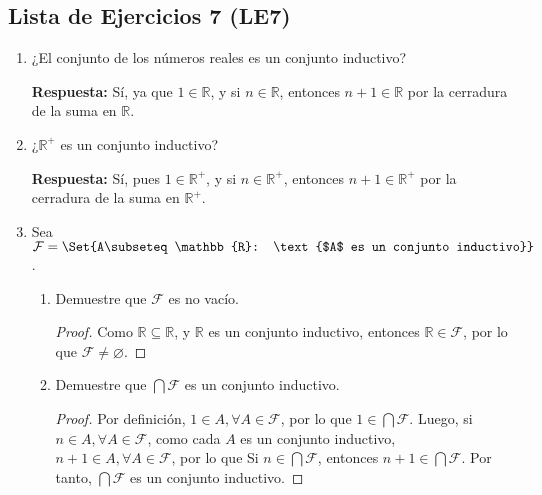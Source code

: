 \documentclass[11pt]{article}
\newcommand{\R}{\mathbb{R}}
\let\emptyset\varnothing
\let\set\Set
\let\subset\subseteq
\begin{document}
\subsection*{Lista de Ejercicios 7 (LE7)}

\begin{enumerate}[label=\arabic*)]
    \item ¿El conjunto de los números reales es un conjunto inductivo?
    
    \textbf{Respuesta:} Sí, ya que $1 \in \R$, y si $n\in \R$, entonces $n+1 \in \R$ por la cerradura de la suma en $\R$.


    \item ¿$\R^+$ es un conjunto inductivo?
    
    \textbf{Respuesta:} Sí, pues $1\in \R^+$, y si $n\in \R^+$, entonces $n+1 \in \R^+$ por la cerradura de la suma en $\R^+$.

    \item Sea $\mathcal{F}= \set{A\subset \R: \text{$A$ es un conjunto inductivo}}$.
    \begin{enumerate}[label=\alph*)]
    \item Demuestre que $\mathcal{F}$ es no vacío.
    \begin{proof}
        Como $\R \subset \R$, y $\R$ es un conjunto inductivo, entonces $\R \in \mathcal{F}$, por lo que $\mathcal{F} \neq \emptyset$.
    \end{proof}%
    \item Demuestre que $\bigcap \mathcal{F}$ es un conjunto inductivo.%
    \begin{proof}
    Por definición, $1\in A, \forall A\in \mathcal{F}$, por lo que $1\in \bigcap \mathcal{F}$. Luego, si $n\in A, \forall A\in \mathcal{F}$, como cada $A$ es un conjunto inductivo, $n+1\in A, \forall A\in \mathcal{F}$, por lo que Si $n \in \bigcap \mathcal{F}$, entonces $n+1 \in \bigcap \mathcal{F}$. Por tanto, $\bigcap \mathcal{F}$ es un conjunto inductivo.
    \end{proof}%
    \end{enumerate}

\end{enumerate}
\end{document}
